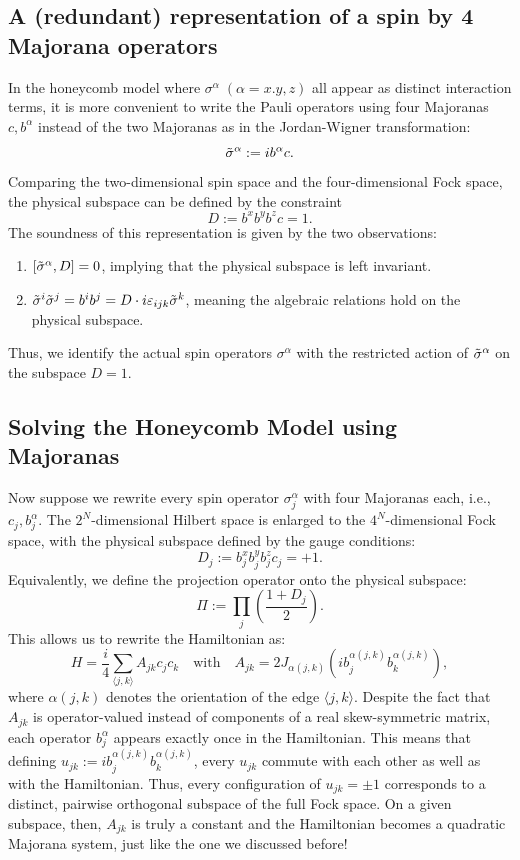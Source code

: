 \documentclass{article}
\begin{document}
\subsection{A (redundant) representation of a spin by 4 Majorana operators}
In the honeycomb model where $\sigma^\alpha\; (\alpha = x. y, z)$ all appear as distinct interaction terms,
it is more convenient to write the Pauli operators using four Majoranas $c, b^\alpha$
instead of the two Majoranas as in the Jordan-Wigner transformation:
\[
    \Tilde\sigma^\alpha := ib^\alpha c.
\]
Comparing the two-dimensional spin space and the four-dimensional Fock space,
the physical subspace can be defined by the constraint
\[
    D := b^x b^y b^z c = 1.
\]
The soundness of this representation is given by the two observations:
\begin{enumerate}
    \item $[\Tilde\sigma^\alpha, D] = 0$,
        implying that the physical subspace is left invariant.
    \item $\Tilde\sigma^i\Tilde\sigma^j = b^i b^j = D \cdot i\varepsilon_{ijk} \Tilde\sigma^k$,
        meaning the algebraic relations hold on the physical subspace.
\end{enumerate}
Thus, we identify the actual spin operators $\sigma^\alpha$ with the restricted action of $\Tilde\sigma^\alpha$ on the subspace $D = 1$.

\subsection{Solving the Honeycomb Model using Majoranas}
Now suppose we rewrite every spin operator $\sigma_j^\alpha$ with four Majoranas each, i.e., $c_j, b_j^\alpha$.
The $2^N$-dimensional Hilbert space is enlarged to the $4^N$-dimensional Fock space,
with the physical subspace defined by the gauge conditions:
\[
    D_j := b_j^x b_j^y b_j^z c_j = +1.
\]
Equivalently, we define the projection operator onto the physical subspace:
\[
    \Pi := \prod_j \left(\frac{1+D_j}{2}\right).
\]
This allows us to rewrite the Hamiltonian as:
\[
    H = \frac{i}{4} \sum_{\langle j, k\rangle} A_{jk} c_j c_k\quad\text{with}\quad
    A_{jk} = 2J_{\alpha(j,k)} (ib_j^{\alpha(j,k)}b_k^{\alpha(j,k)}),
\]
where $\alpha(j,k)$ denotes the orientation of the edge $\langle j, k\rangle$.
Despite the fact that $A_{jk}$ is operator-valued instead of components of a real skew-symmetric matrix,
each operator $b_j^\alpha$ appears exactly once in the Hamiltonian.
This means that defining $u_{jk} := ib_j^{\alpha(j,k)}b_k^{\alpha(j,k)}$,
every $u_{jk}$ commute with each other as well as with the Hamiltonian.
Thus, every configuration of $u_{jk} = \pm 1$ corresponds to a distinct, pairwise orthogonal
subspace of the full Fock space.
On a given subspace, then, $A_{jk}$ is truly a constant and the Hamiltonian becomes a quadratic Majorana system,
just like the one we discussed before!
\end{document}
